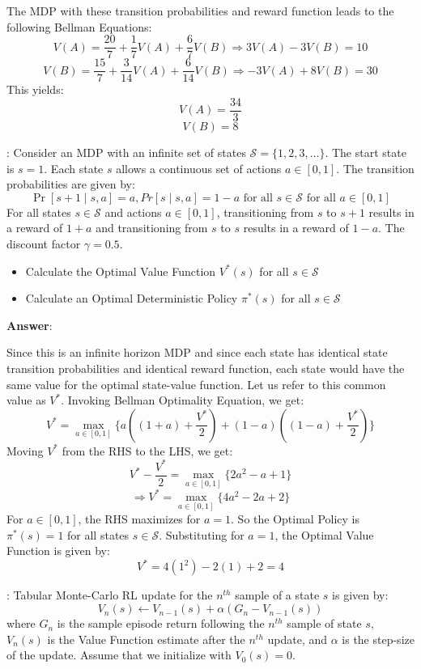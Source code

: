 \documentclass[12pt]{exam}
\begin{document}
\begin{questions}
The MDP with these transition probabilities and reward function leads to the following Bellman Equations:
$$V(A) = \frac {20} 7 + \frac 1 7 V(A) + \frac 6 7 V(B) \Rightarrow 3V(A) - 3V(B) = 10$$
$$V(B) = \frac {15} 7 + \frac 3 {14} V(A) + \frac 6 {14} V(B) \Rightarrow -3V(A) + 8V(B) = 30$$
This yields:
$$V(A) = \frac {34} 3$$
$$V(B) = 8$$
\vspace{15mm}

: Consider an MDP with an infinite set of states $\mathcal{S} = \{1,2,3,\ldots \}$. The start state is $s=1$. Each state $s$ allows a continuous set of actions $a \in [0,1]$. The transition probabilities are given by: $$\Pr[s+1 \mid s, a] = a, Pr[s \mid s, a] = 1 - a \mbox{ for all } s \in \mathcal{S} \mbox{ for all } a \in [0,1]$$
 For all states $s \in \mathcal{S}$ and actions $a \in [0,1]$, transitioning from $s$ to $s+1$ results in a reward of $1+a$ and transitioning from $s$ to $s$ results in a reward of $1-a$. The discount factor $\gamma=0.5$.
\begin{itemize}
\item Calculate the Optimal Value Function $V^*(s)$ for all $s \in \mathcal{S}$
\item Calculate an Optimal Deterministic Policy $\pi^*(s)$ for all $s \in \mathcal{S}$
\end{itemize}

{\bf Answer}:

Since this is an infinite horizon MDP and since each state has identical state transition probabilities and identical reward function, each state would have the same value for the optimal state-value function. Let us refer to this common value as $V^*$. Invoking Bellman Optimality Equation, we get:
$$V^* = \max_{a \in [0,1]} \{ a((1+a) + \frac {V^*} 2) + (1-a)((1-a) + \frac {V^*} 2) \}$$
Moving $V^*$ from the RHS to the LHS, we get:
$$V^* - \frac {V^*} 2 = \max_{a \in [0,1]} \{ 2a^2 - a + 1 \}$$
$$\Rightarrow V^* = \max_{a \in [0,1]} \{ 4a^2 - 2a + 2 \}$$
For $a \in [0, 1]$, the RHS maximizes for $a=1$.
So the Optimal Policy is $\pi^*(s) = 1$ for all states $s \in \mathcal{S}$.
Substituting for $a = 1$, the Optimal Value Function is given by:
$$V^* = 4(1^2) - 2(1) + 2 = 4$$
\vspace{15mm}
 
: Tabular Monte-Carlo RL update for the $n^{th}$ sample of a state $s$ is given by:
$$V_n(s) \leftarrow V_{n-1}(s) + \alpha(G_n - V_{n-1}(s))$$
where $G_n$ is the sample episode return following the $n^{th}$ sample of state $s$, $V_n(s)$ is the Value Function estimate after the $n^{th}$ update, and $\alpha$ is the step-size of the update. Assume that we initialize with $V_0(s) = 0$.


\end{questions}
\end{document}
